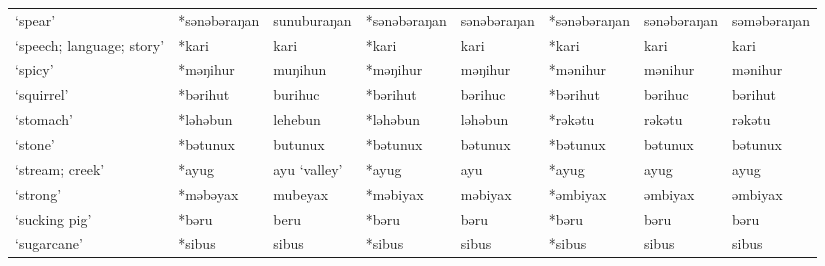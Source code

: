 \begin{landscape}
\begin{longtable}[c]{@{}p{3cm}<{\raggedright}p{2.75cm}<{\raggedright}p{2.75cm}<{\raggedright}p{2.75cm}<{\raggedright}p{2.75cm}<{\raggedright}p{2.75cm}<{\raggedright}p{2.75cm}<{\raggedright}p{2.75cm}<{\raggedright}@{}}
`spear'                                              & *sənəbəraŋan       & sunuburaŋan                    & *sənəbəraŋan       & sənəbəraŋan                & *sənəbəraŋan     & sənəbəraŋan              & səməbəraŋan                       \\
`speech; language; story'                            & *kari              & kari                           & *kari              & kari                       & *kari            & kari                     & kari                              \\
`spicy'                                              & *məŋihur           & muŋihun                        & *məŋihur           & məŋihur                    & *mənihur         & mənihur                  & mənihur                           \\
`squirrel'                                           & *bərihut           & burihuc                        & *bərihut           & bərihuc                    & *bərihut         & bərihuc                  & bərihut                           \\
`stomach'                                            & *ləhəbun           & lehebun                        & *ləhəbun           & ləhəbun                    & *rəkətu          & rəkətu                   & rəkətu                            \\
`stone'                                              & *bətunux           & butunux                        & *bətunux           & bətunux                    & *bətunux         & bətunux                  & bətunux                           \\
`stream; creek'                                      &  *ayug             & ayu `valley'                   & *ayug              & ayu                        & *ayug            & ayug                     & ayug                              \\
`strong'                                             & *məbəyax           & mubeyax                        & *məbiyax           & məbiyax                    & *əmbiyax         & əmbiyax                  & əmbiyax                           \\
`sucking pig'                                        & *bəru              & beru                           & *bəru              & bəru                       & *bəru            & bəru                     & bəru                              \\
`sugarcane'                                          & *sibus             & sibus                          & *sibus             & sibus                      & *sibus           & sibus                    & sibus                             \\

\end{longtable}
\end{landscape}
